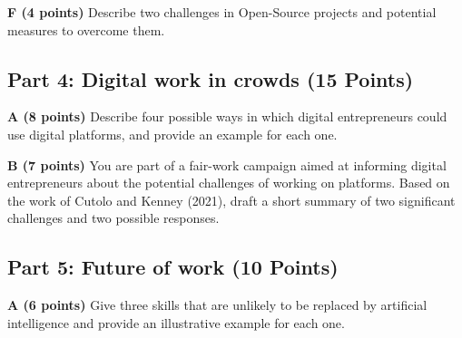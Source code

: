 \documentclass[12pt]{scrartcl}
\begin{document}
\vspace{0.3cm}

\textbf{F (4 points)} Describe two challenges in Open-Source projects and potential measures to overcome them.

\subsection*{Part 4: Digital work in crowds (15 Points)}

\textbf{A (8 points)} Describe four possible ways in which digital entrepreneurs could use digital platforms, and provide an example for each one.

\vspace{0.3cm}

\textbf{B (7 points)} You are part of a fair-work campaign aimed at informing digital entrepreneurs about the potential challenges of working on platforms. Based on the work of Cutolo and Kenney (2021), draft a short summary of two significant challenges and two possible responses.

\subsection*{Part 5: Future of work (10 Points)}

\textbf{A (6 points)} Give three skills that are unlikely to be replaced by artificial intelligence and provide an illustrative example for each one.
\end{document}

